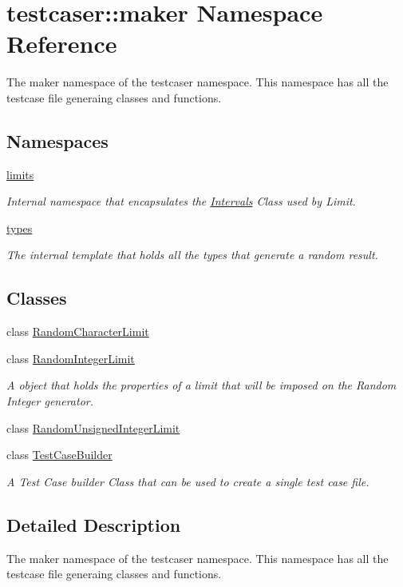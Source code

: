 \hypertarget{namespacetestcaser_1_1maker}{}\section{testcaser\+:\+:maker Namespace Reference}
\label{namespacetestcaser_1_1maker}


The maker namespace of the testcaser namespace. This namespace has all the testcase file generaing classes and functions.  


\subsection*{Namespaces}
\begin{DoxyCompactItemize}
\item 
 \mbox{\hyperlink{namespacetestcaser_1_1maker_1_1limits}{limits}}
\begin{DoxyCompactList}\small\item\em Internal namespace that encapsulates the \mbox{\hyperlink{structtestcaser_1_1maker_1_1limits_1_1Intervals}{Intervals}} Class used by Limit. \end{DoxyCompactList}\item 
 \mbox{\hyperlink{namespacetestcaser_1_1maker_1_1types}{types}}
\begin{DoxyCompactList}\small\item\em The internal template that holds all the types that generate a random result. \end{DoxyCompactList}\end{DoxyCompactItemize}
\subsection*{Classes}
\begin{DoxyCompactItemize}
\item 
class \mbox{\hyperlink{classtestcaser_1_1maker_1_1RandomCharacterLimit}{Random\+Character\+Limit}}
\item 
class \mbox{\hyperlink{classtestcaser_1_1maker_1_1RandomIntegerLimit}{Random\+Integer\+Limit}}
\begin{DoxyCompactList}\small\item\em A object that holds the properties of a limit that will be imposed on the Random Integer generator. \end{DoxyCompactList}\item 
class \mbox{\hyperlink{classtestcaser_1_1maker_1_1RandomUnsignedIntegerLimit}{Random\+Unsigned\+Integer\+Limit}}
\item 
class \mbox{\hyperlink{classtestcaser_1_1maker_1_1TestCaseBuilder}{Test\+Case\+Builder}}
\begin{DoxyCompactList}\small\item\em A Test Case builder Class that can be used to create a single test case file. \end{DoxyCompactList}\end{DoxyCompactItemize}


\subsection{Detailed Description}
The maker namespace of the testcaser namespace. This namespace has all the testcase file generaing classes and functions. 

